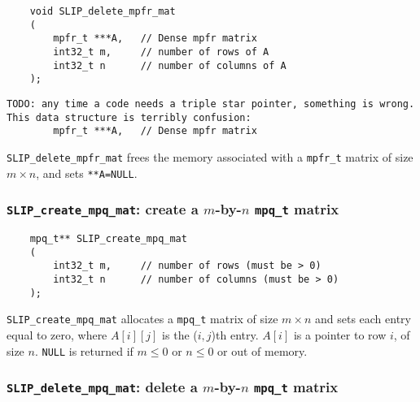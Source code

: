 \documentclass[12pt]{article}
\theoremstyle{definition}
\begin{document}
\begin{mdframed}[userdefinedwidth=6in]
{\footnotesize
\begin{verbatim}
    void SLIP_delete_mpfr_mat
    (
        mpfr_t ***A,   // Dense mpfr matrix
        int32_t m,     // number of rows of A
        int32_t n      // number of columns of A
    );
\end{verbatim}
} \end{mdframed}

\begin{verbatim}
TODO: any time a code needs a triple star pointer, something is wrong.
This data structure is terribly confusion:
        mpfr_t ***A,   // Dense mpfr matrix
\end{verbatim}

\verb|SLIP_delete_mpfr_mat| frees the memory associated with a \verb|mpfr_t|
matrix of size $m \times n$, and sets \verb|**A=NULL|.

\cprotect\subsubsection{\verb|SLIP_create_mpq_mat|: create a $m$-by-$n$ \verb|mpq_t| matrix}
\label{ss:create_mpq_mat}

\begin{mdframed}[userdefinedwidth=6in]
{\footnotesize
\begin{verbatim}
    mpq_t** SLIP_create_mpq_mat
    (
        int32_t m,     // number of rows (must be > 0)
        int32_t n      // number of columns (must be > 0)
    );
\end{verbatim}
} \end{mdframed}

\verb|SLIP_create_mpq_mat| allocates a \verb|mpq_t| matrix of size $m \times n$
and sets each entry equal to zero, where $A[i][j]$ is the ($i,j$)th entry.
$A[i]$ is a pointer to row $i$, of size $n$. \verb|NULL| is returned if
$m \le 0 $ or $n\le 0$ or out of memory.


\cprotect\subsubsection{\verb|SLIP_delete_mpq_mat|: delete a $m$-by-$n$ \verb|mpq_t| matrix}
\end{document}
